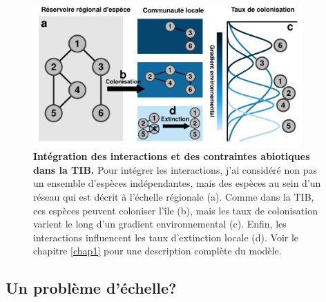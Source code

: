 \begin{figure}[htbp]
\centering
\includegraphics[width=0.92000\textwidth]{fig/fig2.pdf}
\caption{\textbf{Intégration des interactions et des contraintes
abiotiques dans la TIB.} Pour intégrer les interactions, j'ai considéré
non pas un ensemble d'espèces indépendantes, mais des espèces au sein
d'un réseau qui est décrit à l'échelle régionale (a). Comme dans la TIB,
ces espèces peuvent coloniser l'île (b), mais les taux de colonisation
varient le long d'un gradient environnemental (c). Enfin, les
interactions influencent les taux d'extinction locale (d). Voir le
chapitre \ref{chap1} pour une description complète du
modèle.\label{fig:figGTIB}}
\end{figure}

\subsection*{Un problème d'échelle?}\label{un-probluxe8me-duxe9chelle}

